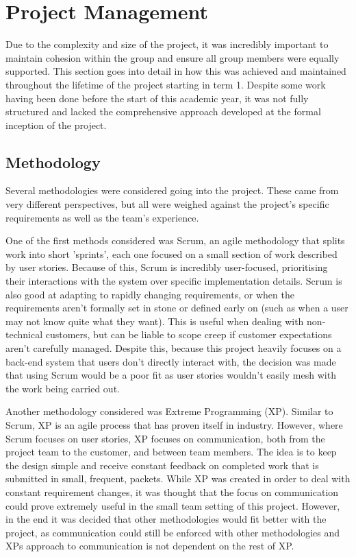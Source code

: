 \chapter{Project Management}
Due to the complexity and size of the project, it was incredibly important to maintain cohesion within the group and ensure all group members were equally supported. This section goes into detail in how this was achieved and maintained throughout the lifetime of the project starting in term 1. Despite some work having been done before the start of this academic year, it was not fully structured and lacked the comprehensive approach developed at the formal inception of the project.  

\section{Methodology}
Several methodologies were considered  going into the project. These came from very different perspectives, but all were weighed against the project's specific requirements as well as the team's experience.

One of the first methods considered was Scrum\cite{ScrumGuide}, an agile methodology that splits work into short 'sprints', each one focused on a small section of work described by user stories. Because of this, Scrum is incredibly user-focused, prioritising their interactions with the system over specific implementation details. Scrum is also good at adapting to rapidly changing requirements, or when the requirements aren't formally set in stone or defined early on (such as when a user may not know quite what they want). This is useful when dealing with non-technical customers, but can be liable to scope creep if customer expectations aren't carefully managed. Despite this, because this project heavily focuses on a back-end system that users don't directly interact with, the decision was made that using Scrum would be a poor fit as user stories wouldn't easily mesh with the work being carried out.

Another methodology considered was Extreme Programming (XP)\cite{XP}. Similar to Scrum, XP is an agile process that has proven itself in industry. However, where Scrum focuses on user stories, XP focuses on communication, both from the project team to the customer, and between team members. The idea is to keep the design simple and receive constant feedback on completed work that is submitted in small, frequent, packets. While XP was created in order to deal with constant requirement changes, it was thought that the focus on communication could prove extremely useful in the small team setting of this project. However, in the end it was decided that other methodologies would fit better with the project, as communication could still be enforced with other methodologies and XPs approach to communication is not dependent on the rest of XP.

